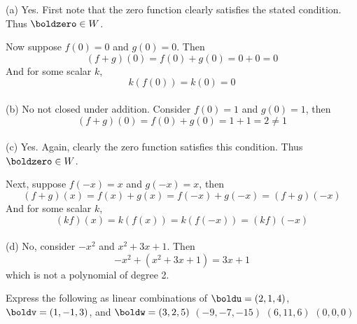 \ee
\begin{solution}
\noindent 
(a)
Yes. First note that the zero function clearly satisfies the stated condition. Thus $\boldzero\in W$. 

Now suppose $f(0) = 0$ and $g(0) = 0$. Then
$$
(f + g)(0) = f(0) + g(0) = 0 + 0 = 0
$$
And for some scalar $k$,
$$
k(f(0)) = k(0) = 0
$$
\ \\
(b) No not closed under addition. Consider $f(0) = 1$ and $g(0) = 1$, then
$$
(f+g)(0) = f(0)+g(0) = 1 + 1 =2 \neq 1
$$
\ \\
(c) Yes. Again, clearly the zero function satisfies this condition. Thus $\boldzero\in W$. 

Next, suppose  $f(-x) = x$ and $g(-x) = x$, then
$$
(f+g)(x) = f(x) + g(x) = f(-x) +g(-x) = (f+g)(-x)
$$
And for some scalar $k$,
$$
(kf)(x)=k(f(x))=k(f(-x)) = (kf)(-x)
$$
\ \\
(d) No, consider $-x^2$ and $x^2 +3x +1$. Then
$$
-x^2 +(x^2 +3x +1) = 3x +1
$$
which is not a polynomial of degree 2.
\end{solution}
\ii Express the following as linear combinations of $\boldu = (2,1,4)$, $\boldv = (1,-1,3)$, and $\boldw = (3,2,5)$
\bb
\ii $(-9,-7,-15)$
\ii $(6,11,6)$
\ii $(0,0,0)$

